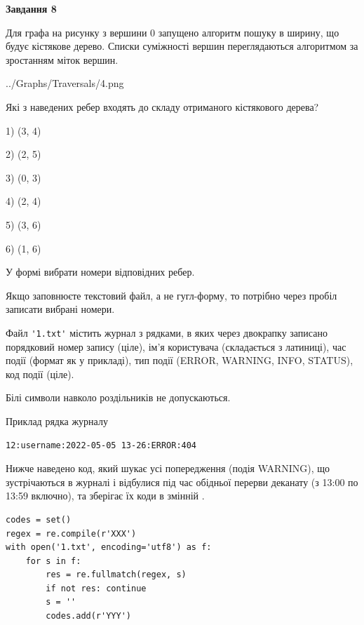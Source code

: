 \documentclass[12pt, ukrainian]{article}
\def\code#1{\Verb!#1!}
\begin{document}
{\begin {large}
{\begin {center}\textbf{Завдання 8}\end {center}}\par
Для графа на рисунку з вершини 0 запущено алгоритм пошуку в ширину, що будує кістякове дерево. Списки суміжності вершин переглядаються алгоритмом за зростанням міток вершин.\par
\begin{center}
	{../Graphs/Traversals/4.png}
\end{center}
\par Які з наведених ребер входять до складу отриманого кістякового дерева?\par
1) (3, 4)\par
2) (2, 5)\par
3) (0, 3)\par
4) (2, 4)\par
5) (3, 6)\par
6) (1, 6)\par
{\vskip 15pt} У формі вибрати номери відповідних ребер.


Якщо заповнюєте текстовий файл, а не гугл-форму, то потрібно через пробіл записа\-ти вибрані номери.\par
\newpage


Файл \code{'1.txt'} містить журнал з рядками, в яких через двокрапку записано поряд\-ко\-вий номер запису (ціле), ім'я користувача (складається з латиниці), час події (фор\-мат як у прикладі), тип події (ERROR, WARNING, INFO, STATUS), код події (ціле).

Білі символи навколо роздільників не допускаються.

Приклад рядка журналу



\begin{verbatim}
12:username:2022-05-05 13-26:ERROR:404
\end{verbatim}


Нижче наведено код, який шукає усі попередження (подія WARNING), що зустрі\-ча\-ються в журналі і відбулися під час обідньої перерви деканату (з 13:00 по 13:59 включно), та зберігає їх коди в змінній .



\begin{verbatim}
codes = set()
regex = re.compile(r'XXX')
with open('1.txt', encoding='utf8') as f:
    for s in f:
        res = re.fullmatch(regex, s)
        if not res: continue
        s = ''
        codes.add(r'YYY')
\end{verbatim}





\end{large}}
\end{document}
